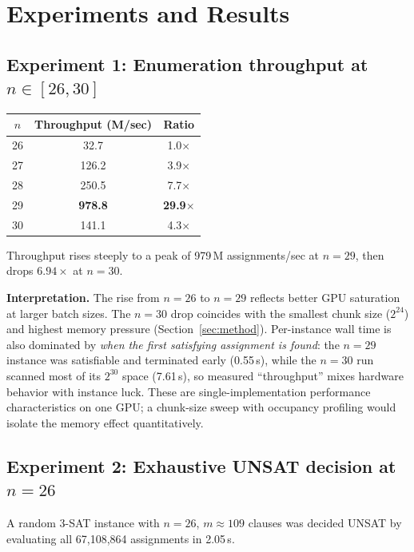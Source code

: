 \documentclass[11pt]{article}
\newcommand{\SAT}{\textsf{SAT}}
\begin{document}
\section{Experiments and Results}
\label{sec:experiments}

\subsection{Experiment 1: Enumeration throughput at $n \in [26,30]$}
\label{sec:exp1}

\begin{center}
\begin{tabular}{ccc}
\toprule
$n$ & Throughput (M/sec) & Ratio \\
\midrule
26 & 32.7 & 1.0$\times$ \\
27 & 126.2 & 3.9$\times$ \\
28 & 250.5 & 7.7$\times$ \\
29 & \textbf{978.8} & \textbf{29.9$\times$} \\
30 & 141.1 & 4.3$\times$ \\
\bottomrule
\end{tabular}
\end{center}

Throughput rises steeply to a peak of 979\,M assignments/sec at $n=29$, then drops $6.94\times$ at $n=30$.

\textbf{Interpretation.} The rise from $n=26$ to $n=29$ reflects better GPU saturation at larger batch sizes. The $n=30$ drop coincides with the smallest chunk size ($2^{24}$) and highest memory pressure (Section~\ref{sec:method}). Per-instance wall time is also dominated by \emph{when the first satisfying assignment is found}: the $n=29$ instance was satisfiable and terminated early (0.55\,s), while the $n=30$ run scanned most of its $2^{30}$ space (7.61\,s), so measured ``throughput'' mixes hardware behavior with instance luck. These are single-implementation performance characteristics on one GPU; a chunk-size sweep with occupancy profiling would isolate the memory effect quantitatively.

\subsection{Experiment 2: Exhaustive UNSAT decision at $n=26$}
\label{sec:exp2}

A random 3-\SAT{} instance with $n=26$, $m \approx 109$ clauses was decided UNSAT by evaluating all 67{,}108{,}864 assignments in 2.05\,s.
\end{document}
